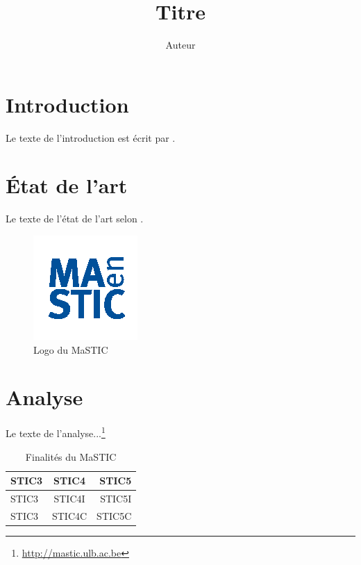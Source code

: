 \documentclass[a4paper,11pt]{article} %
\title{Titre} %
\author{Auteur} %
\date{} %
\begin{document}
\maketitle %

\section{Introduction} %
Le texte de l'introduction est écrit par \citet{Boy99}. %

\section{État de l'art} %
Le texte de l'état de l'art selon \citet[p. 123]{Boy11}. %

\begin{figure}[h] %
  \centering %
  \includegraphics[scale=1]{image} %
  \caption{Logo du MaSTIC} %
\end{figure}

\section{Analyse} %
Le texte de l'analyse...\footnote{\url{http://mastic.ulb.ac.be}}

\begin{table}[h] %
  \centering %
  \begin{tabular}{|l|c|r|} %
    \hline %
    STIC3 & STIC4 & STIC5 \\ %
    \hline
    STIC3 & STIC4I & STIC5I \\
    STIC3 & STIC4C & STIC5C \\
    \hline
  \end{tabular}
  \caption{Finalités du MaSTIC}
\end{table}
\end{document}
